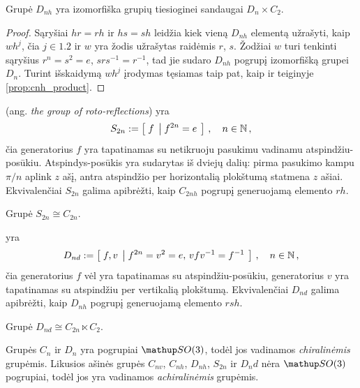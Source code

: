 \begin{proposition}
	Grupė $D_{nh}$ yra izomorfiška grupių tiesioginei sandaugai $D_n \times C_2$.
\end{proposition}
\begin{proof}
	Sąryšiai $hr=rh$ ir $hs=sh$ leidžia kiek vieną $D_{nh}$ elementą užrašyti,
	kaip $wh^j$, čia $j \in \qty{1,2}$ ir $w$ yra žodis užrašytas raidėmis $r$, $s$.
	Žodžiai $w$ turi tenkinti sąryšius $r^n=s^2=e$, $srs^{-1}=r^{-1}$,
	tad jie sudaro $D_{nh}$ pogrupį izomorfišką grupei $D_n$.
	Turint išskaidymą $wh^j$ įrodymas tęsiamas taip pat,
	kaip ir teiginyje \ref{prop:cnh_product}.
\end{proof}


\begin{definition}
	 (ang. \emph{the group of roto-reflections}) yra
	\begin{equation}
		S_{2n} := \left[\; f \;\left|\; f^{2n}=e \;\right.\right]
		\,,\quad
		n \in \mathbb{N}
		\,,
	\end{equation}
	čia generatorius $f$ yra tapatinamas su netikruoju pasukimu vadinamu atspindžiu-posūkiu.
	Atspindys-posūkis yra sudarytas iš dviejų dalių:
	pirma pasukimo kampu $\pi/n$ aplink $z$ ašį,
	antra atspindžio per horizontalią plokštumą statmena $z$ ašiai.
	Ekvivalenčiai $S_{2n}$ galima apibrėžti,
	kaip $C_{2nh}$ pogrupį generuojamą elemento $rh$.
\end{definition}

\begin{corollary}
	Grupė $S_{2n} \cong C_{2n}$.
\end{corollary}

\begin{definition}
	 yra
	\begin{equation}
		D_{nd} := \left[\; f,v \;\left|\; f^{2n}=v^2=e,\, vfv^{-1}=f^{-1} \;\right.\right]
		\,,\quad
		n \in \mathbb{N}
		\,,
	\end{equation}
	čia generatorius $f$ vėl yra tapatinamas su atspindžiu-posūkiu,
	generatorius $v$ yra tapatinamas su atspindžiu per vertikalią plokštumą.
	Ekvivalenčiai $D_{nd}$ galima apibrėžti,
	kaip $D_{nh}$ pogrupį generuojamą elemento $rsh$.
\end{definition}

\begin{corollary}
	Grupė $D_{nd} \cong C_{2n} \ltimes C_2$.
\end{corollary}

Grupės $C_n$ ir $D_n$ yra pogrupiai $\SO3$,
todėl jos vadinamos \emph{chiralinėmis} grupėmis.
Likusios ašinės grupės $C_{nv}$, $C_{nh}$, $D_{nh}$, $S_{2n}$ ir $D_nd$ nėra $\SO3$
pogrupiai, todėl jos yra vadinamos \emph{achiralinėmis} grupėmis.


